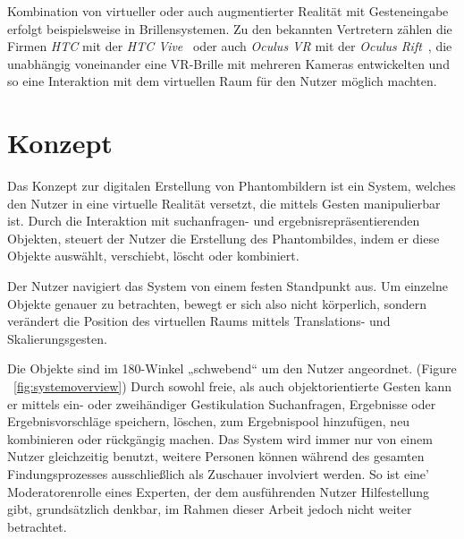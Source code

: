 \documentclass{sigchi-ext}
\begin{document}
Kombination von virtueller oder auch augmentierter Realität mit Gesteneingabe erfolgt beispielsweise in Brillensystemen. Zu den bekannten Vertretern zählen die Firmen \textit{HTC} mit der \textit{HTC Vive}~\cite{vive} oder auch \textit{Oculus VR} mit der \textit{Oculus Rift}~\cite{oculus}, die unabhängig voneinander eine VR-Brille mit mehreren Kameras entwickelten und so eine Interaktion mit dem virtuellen Raum für den Nutzer möglich machten.

\section{Konzept}

Das Konzept zur digitalen Erstellung von Phantombildern ist ein System, welches den Nutzer in eine virtuelle Realität versetzt, die mittels Gesten manipulierbar ist. Durch die Interaktion mit suchanfragen- und ergebnisrepräsentierenden Objekten, steuert der Nutzer die Erstellung des Phantombildes, indem er diese Objekte auswählt, verschiebt, löscht oder kombiniert. 

Der Nutzer navigiert das System von einem festen Standpunkt aus. Um einzelne Objekte genauer zu betrachten, bewegt er sich also nicht körperlich, sondern verändert die Position des virtuellen Raums mittels Translations- und Skalierungsgesten.

Die Objekte sind im 180-Winkel „schwebend“ um den Nutzer angeordnet. (Figure ~\ref{fig:systemoverview}) Durch sowohl freie, als auch objektorientierte Gesten kann er mittels ein- oder zweihändiger Gestikulation Suchanfragen, Ergebnisse oder Ergebnisvorschläge speichern, löschen, zum Ergebnispool hinzufügen, neu kombinieren oder rückgängig machen.
Das System wird immer nur von einem Nutzer gleichzeitig benutzt,
weitere Personen können während des gesamten Findungsprozesses
ausschließlich als Zuschauer involviert werden. So ist eine'
Moderatorenrolle eines Experten, der dem ausführenden Nutzer Hilfestellung gibt, grundsätzlich denkbar, im Rahmen dieser Arbeit jedoch nicht weiter betrachtet.
\end{document}
